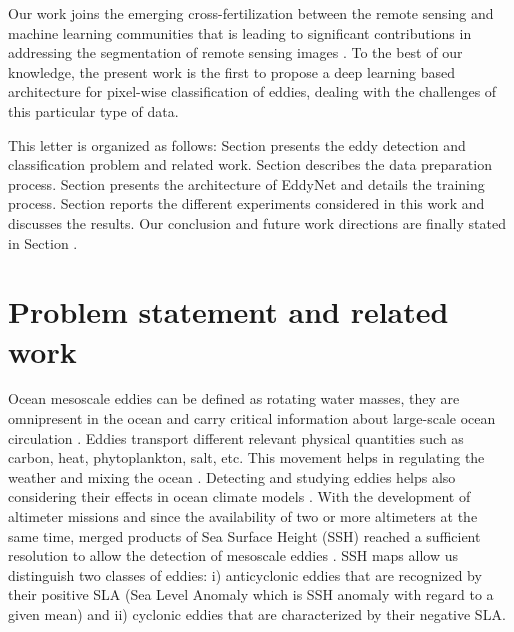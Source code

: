 \documentclass[journal]{IEEEtran}
\begin{document}
Our work joins the emerging cross-fertilization between the remote sensing and machine learning communities that is leading to significant contributions in addressing the segmentation of remote sensing images \cite{maggiori,audebert2016semantic,volpi2017dense}. To the best of our knowledge, the present work is the first to propose a deep learning based architecture for pixel-wise classification of eddies, dealing with the challenges of this particular type of data.

This letter is organized as follows: Section \uppercase\expandafter{} presents the eddy detection and classification problem and related work. Section \uppercase\expandafter{} describes the data preparation process. Section \uppercase\expandafter{} presents the architecture of EddyNet and details the training process. Section \uppercase\expandafter{} reports the different experiments considered in this work and discusses the results. Our conclusion and future work directions are finally stated in Section \uppercase\expandafter{}. 

\section{Problem statement and related work}

Ocean mesoscale eddies can be defined as rotating water masses, they are omnipresent in the ocean and carry critical information about large-scale ocean circulation \cite{holland1978role,chelton2011global}. Eddies transport different relevant physical quantities such as carbon, heat, phytoplankton, salt, etc. This movement helps in regulating the weather and mixing the ocean \cite{mcwilliams2008nature}. Detecting and studying eddies helps also considering their effects in ocean climate models \cite{le2011parameterization}. With the development of altimeter missions and since the availability of two or more altimeters at the same time, merged products of Sea Surface Height (SSH) reached a sufficient resolution to allow the detection of mesoscale eddies \cite{faghmous2015daily,pascual2006improved}. SSH maps allow us distinguish two classes of eddies: i) anticyclonic eddies that are recognized by their positive SLA (Sea Level Anomaly which is SSH anomaly with regard to a given mean) and ii) cyclonic eddies that are characterized by their negative SLA.
% 
% 
 
\end{document}
